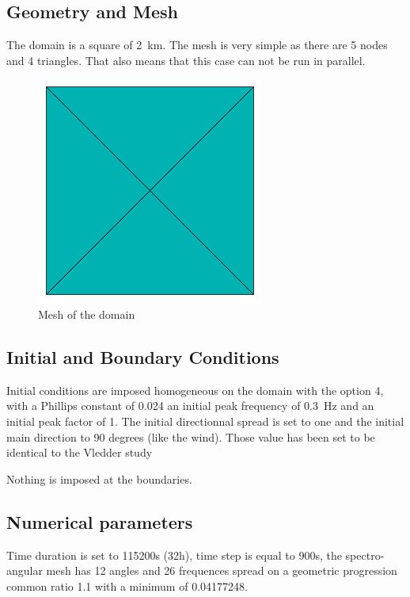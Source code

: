 \subsection{Geometry and Mesh}
%
The domain is a square of 2~km.
The mesh is very simple as there are 5 nodes and 4 triangles. That also means that this case can not be run in parallel.
\begin{figure} [!h]
\centering
\includegraphics[scale = 0.65]{maillage.png}
 \caption{Mesh of the domain}
\label{mailTW}
\end{figure}
%
%
\subsection{Initial and Boundary Conditions}
%
Initial conditions are imposed homogeneous on the domain with the option 4, with a Phillips constant of 0.024 an initial peak frequency of 0.3~Hz  and an initial peak factor of 1.  The initial directionnal spread is set to one and the initial main direction to 90 degrees (like the wind).
Those value has been set to be identical to the Vledder study \cite{Vanvledder1990}

Nothing is imposed at the boundaries.
%
%
\subsection{Numerical parameters}
Time duration is set to 115200s (32h), time step is equal to 900s, the spectro-angular mesh has 12 angles and 26 frequences spread on a geometric progression common ratio 1.1 with a minimum of 0.04177248.

